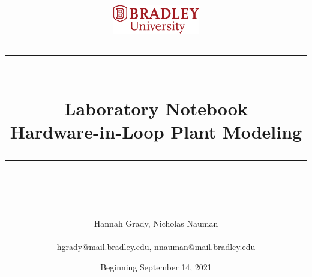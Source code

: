 \documentclass[fontsize=11pt, %
                             paper=letter, %
                             openany, %
                             captions=tableheading,
                             index=totoc,
                             hyperref]{labbook}
\def\currentYear{2021}
\newcommand{\HRule}{\rule{\linewidth}{0.5mm}} %
\begin{document}


%

\title{
\begin{center}
\href{http://www.bradley.edu}{\includegraphics[height=0.5in]{figs/logoBU1-Print}}
\vskip10pt
\HRule \\[0.4cm]
{\Huge \bfseries Laboratory Notebook \\[0.5cm] \Large Hardware-in-Loop Plant Modeling}\\[0.4cm] %
\HRule \\[1.5cm]
\end{center}
}
\author{ Hannah Grady, Nicholas Nauman \\ \\\Large hgrady@mail.bradley.edu, nnauman@mail.bradley.edu} %
\date{Beginning September 14, \currentYear} %
\maketitle



\printindex
\tableofcontents %
\newpage %
\end{document}
